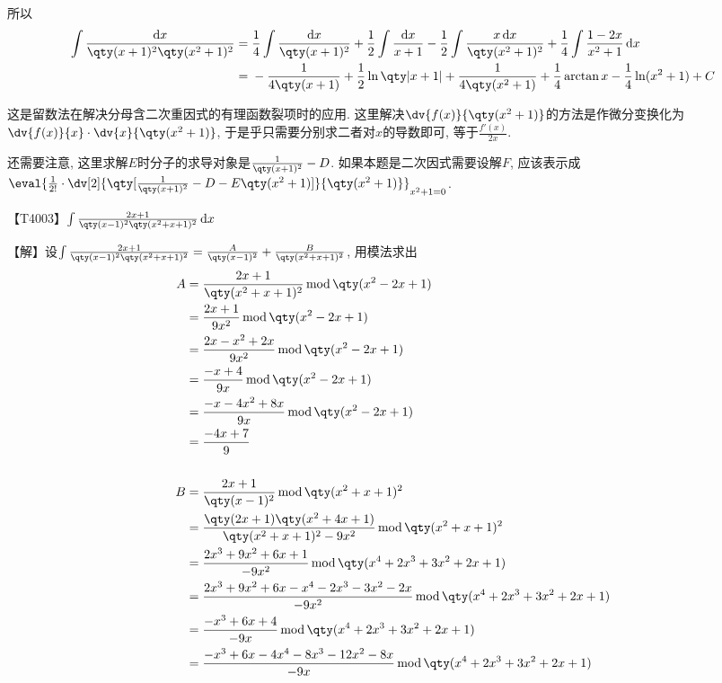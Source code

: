 \documentclass{ctexbook}
\newcommand*{\dif}{\mathop{}\!\mathrm{d}}
\newcommand{\m}{\,\mathrm{mod}\,}
\begin{document}
{所以
\begin{align*}
\int\frac{\dif{x}}{\qty(x+1)^{2}\qty(x^{2}+1)^{2}}={}&\frac{1}{4}\int\frac{\dif{x}}{\qty(x+1)^{2}}+\frac{1}{2}\int\frac{\dif{x}}{x+1}-\frac{1}{2}\int\frac{x\dif{x}}{\qty(x^{2}+1)^{2}}+\frac{1}{4}\int\frac{1-2x}{x^{2}+1}\dif{x}\\
={}&-\frac{1}{4\qty(x+1)}+\frac{1}{2}\ln\qty|x+1|+\frac{1}{4\qty(x^{2}+1)}+\frac{1}{4}\arctan{x}-\frac{1}{4}\ln(x^{2}+1)+C
\end{align*}\par
{\kaishu 这是留数法在解决分母含二次重因式的有理函数裂项时的应用. 这里解决$\dv{f(x)}{\qty(x^{2}+1)}$的方法是作微分变换化为$\dv{f(x)}{x}\cdot\dv{x}{\qty(x^{2}+1)}$, 于是乎只需要分别求二者对$x$的导数即可, 等于$\frac{f'(x)}{2x}$. \par
还需要注意, 这里求解$E$时分子的求导对象是$\frac{1}{\qty(x+1)^{2}}-D$. 如果本题是二次因式需要设解$F$, 应该表示成$\eval{\frac{1}{2!}\cdot\dv[2]{\qty[\frac{1}{\qty(x+1)^{2}}-D-E\qty(x^{2}+1)]}{\qty(x^{2}+1)}}_{x^{2}+1=0}$. \par}
【T4003】$\int\frac{2x+1}{\qty(x-1)^{2}\qty(x^{2}+x+1)^{2}}\dif{x}$\par
【解】设$\int\frac{2x+1}{\qty(x-1)^{2}\qty(x^{2}+x+1)^{2}}=\frac{A}{\qty(x-1)^{2}}+\frac{B}{\qty(x^{2}+x+1)^{2}}$, 用模法求出
\begin{align*}
A={}&\frac{2x+1}{\qty(x^{2}+x+1)^{2}}\m\qty(x^{2}-2x+1)\\
={}&\frac{2x+1}{9x^{2}}\m\qty(x^{2}-2x+1)\\
={}&\frac{2x-x^{2}+2x}{9x^{2}}\m\qty(x^{2}-2x+1)\\
={}&\frac{-x+4}{9x}\m\qty(x^{2}-2x+1)\\
={}&\frac{-x-4x^{2}+8x}{9x}\m\qty(x^{2}-2x+1)\\
={}&\frac{-4x+7}{9}\\
\\
B={}&\frac{2x+1}{\qty(x-1)^{2}}\m\qty(x^{2}+x+1)^{2}\\
={}&\frac{\qty(2x+1)\qty(x^{2}+4x+1)}{\qty(x^{2}+x+1)^{2}-9x^{2}}\m\qty(x^{2}+x+1)^{2}\\
={}&\frac{2x^{3}+9x^{2}+6x+1}{-9x^{2}}\m\qty(x^{4}+2x^{3}+3x^{2}+2x+1)\\
={}&\frac{2x^{3}+9x^{2}+6x-x^{4}-2x^{3}-3x^{2}-2x}{-9x^{2}}\m\qty(x^{4}+2x^{3}+3x^{2}+2x+1)\\
={}&\frac{-x^{3}+6x+4}{-9x}\m\qty(x^{4}+2x^{3}+3x^{2}+2x+1)\\
={}&\frac{-x^{3}+6x-4x^{4}-8x^{3}-12x^{2}-8x}{-9x}\m\qty(x^{4}+2x^{3}+3x^{2}+2x+1)\\

\end{align*}}
\end{document}
